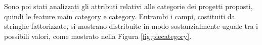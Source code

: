 \begin{figure}%
	\centering
	\qquad
	\caption{}%
	\label{fig:countrygdp}%
\end{figure}

Sono poi stati analizzati gli attributi relativi alle categorie dei progetti proposti, quindi le feature main category e category. Entrambi i campi, costituiti da stringhe fattorizzate, si mostrano distribuite in modo sostanzialmente uguale tra i possibili valori, come mostrato nella Figura \ref{fig:piecategory}. 

